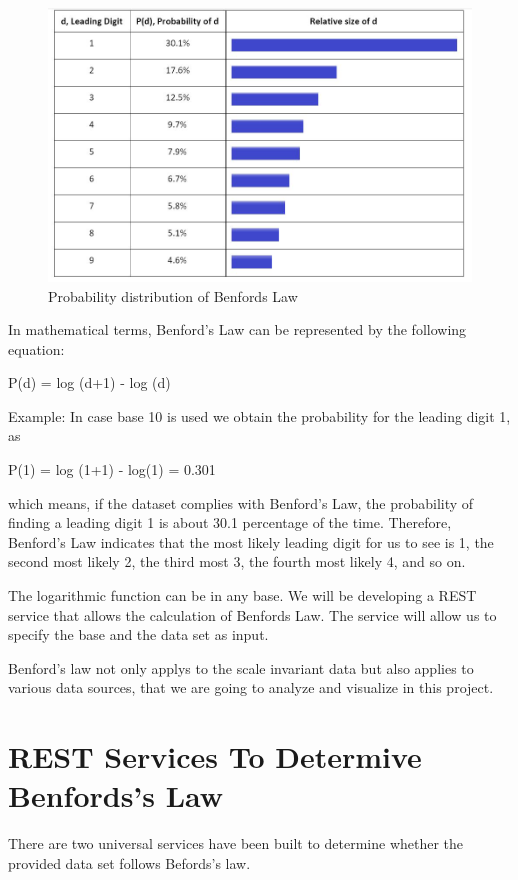 \begin{figure}[!ht]
\centering\includegraphics[width=\columnwidth]{images/benfords_law.JPG}
  \caption{Probability distribution of Benfords Law}\label{f:probability-dist-benfordlaw}
\end{figure}


In mathematical terms, Benford’s Law can be represented 
by the following equation:

P(d) = log (d+1) - log (d)

Example: In case base 10 is used we obtain the 
probability for the leading digit 1, as

P(1) = log (1+1) - log(1) = 0.301

which means, if the dataset complies 
with Benford's Law, the probability of finding a 
leading digit 1 is about 30.1 percentage of the time. 
Therefore, Benford’s Law indicates that the most 
likely leading digit for us to see is 1, the second 
most likely 2, the third most 3, the fourth most 
likely 4, and so on.

The logarithmic function can be in any base. We will 
be developing a REST service that allows the 
calculation of Benfords Law. The service will allow 
us to specify the base and the data set as input.

Benford’s law not only applys to the scale invariant 
data but also applies to various data sources, 
that we are going to analyze and visualize in this project.


\section{REST Services To Determive Benfords's Law}

There are two universal services have been built to determine
whether the provided data set follows Befords's law.

